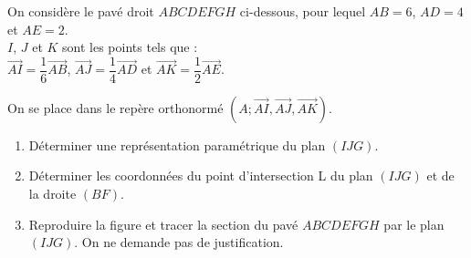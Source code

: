 \documentclass{cornouaille}
\begin{document}
\begin{exercice}
  On considère le pavé droit $ABCDEFGH$ ci-dessous, pour lequel
  $AB = 6$, $AD = 4$ et $AE = 2$.\\
  $I$, $J$ et $K$ sont les points tels que :\\
  $\overrightarrow{AI} = \dfrac{1}{6} \overrightarrow{AB}$,
  $ \overrightarrow{AJ} = \dfrac{1}{4} \overrightarrow{AD}$ et
  $ \overrightarrow{AK} = \dfrac{1}{2} \overrightarrow {AE}$.

  \begin{center}
  \end{center}

On se place dans le repère orthonormé $(A;\vec{AI},\vec{AJ},\vec{AK})$.
\begin{enumerate}
\item Déterminer une représentation paramétrique du plan $(IJG)$.
\item Déterminer les coordonnées du point d'intersection L du plan
  $(IJG)$ et de la droite $(BF)$.
\item Reproduire la figure et tracer la section du pavé $ABCDEFGH$ par
  le plan $(IJG)$. On ne demande pas de justification.
\end{enumerate}
\end{exercice}
\end{document}
